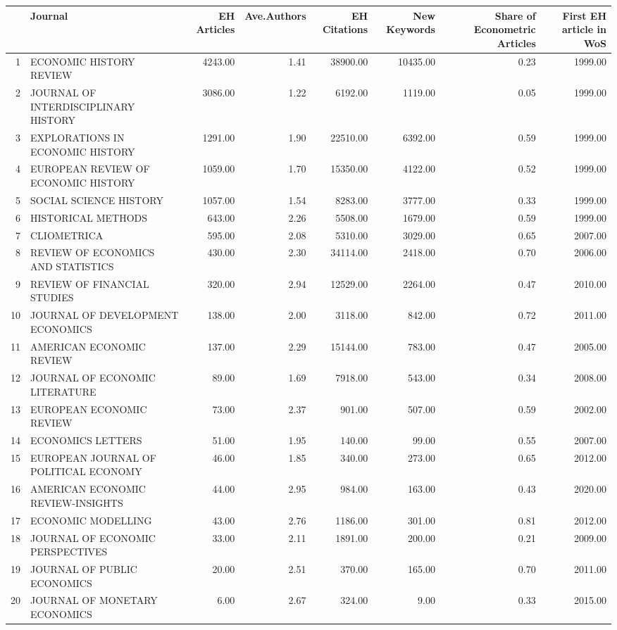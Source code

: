 \begin{table}[ht]
\centering
\begin{tabular}{rlrrrrrr}
  \hline
 & Journal & EH Articles & Ave.Authors & EH Citations & New Keywords & Share of Econometric Articles & First EH article in WoS \\ 
  \hline
1 & ECONOMIC HISTORY REVIEW & 4243.00 & 1.41 & 38900.00 & 10435.00 & 0.23 & 1999.00 \\ 
  2 & JOURNAL OF INTERDISCIPLINARY HISTORY & 3086.00 & 1.22 & 6192.00 & 1119.00 & 0.05 & 1999.00 \\ 
  3 & EXPLORATIONS IN ECONOMIC HISTORY & 1291.00 & 1.90 & 22510.00 & 6392.00 & 0.59 & 1999.00 \\ 
  4 & EUROPEAN REVIEW OF ECONOMIC HISTORY & 1059.00 & 1.70 & 15350.00 & 4122.00 & 0.52 & 1999.00 \\ 
  5 & SOCIAL SCIENCE HISTORY & 1057.00 & 1.54 & 8283.00 & 3777.00 & 0.33 & 1999.00 \\ 
  6 & HISTORICAL METHODS & 643.00 & 2.26 & 5508.00 & 1679.00 & 0.59 & 1999.00 \\ 
  7 & CLIOMETRICA & 595.00 & 2.08 & 5310.00 & 3029.00 & 0.65 & 2007.00 \\ 
  8 & REVIEW OF ECONOMICS AND STATISTICS & 430.00 & 2.30 & 34114.00 & 2418.00 & 0.70 & 2006.00 \\ 
  9 & REVIEW OF FINANCIAL STUDIES & 320.00 & 2.94 & 12529.00 & 2264.00 & 0.47 & 2010.00 \\ 
  10 & JOURNAL OF DEVELOPMENT ECONOMICS & 138.00 & 2.00 & 3118.00 & 842.00 & 0.72 & 2011.00 \\ 
  11 & AMERICAN ECONOMIC REVIEW & 137.00 & 2.29 & 15144.00 & 783.00 & 0.47 & 2005.00 \\ 
  12 & JOURNAL OF ECONOMIC LITERATURE & 89.00 & 1.69 & 7918.00 & 543.00 & 0.34 & 2008.00 \\ 
  13 & EUROPEAN ECONOMIC REVIEW & 73.00 & 2.37 & 901.00 & 507.00 & 0.59 & 2002.00 \\ 
  14 & ECONOMICS LETTERS & 51.00 & 1.95 & 140.00 & 99.00 & 0.55 & 2007.00 \\ 
  15 & EUROPEAN JOURNAL OF POLITICAL ECONOMY & 46.00 & 1.85 & 340.00 & 273.00 & 0.65 & 2012.00 \\ 
  16 & AMERICAN ECONOMIC REVIEW-INSIGHTS & 44.00 & 2.95 & 984.00 & 163.00 & 0.43 & 2020.00 \\ 
  17 & ECONOMIC MODELLING & 43.00 & 2.76 & 1186.00 & 301.00 & 0.81 & 2012.00 \\ 
  18 & JOURNAL OF ECONOMIC PERSPECTIVES & 33.00 & 2.11 & 1891.00 & 200.00 & 0.21 & 2009.00 \\ 
  19 & JOURNAL OF PUBLIC ECONOMICS & 20.00 & 2.51 & 370.00 & 165.00 & 0.70 & 2011.00 \\ 
  20 & JOURNAL OF MONETARY ECONOMICS & 6.00 & 2.67 & 324.00 & 9.00 & 0.33 & 2015.00 \\ 
   \hline
\end{tabular}
\end{table}
